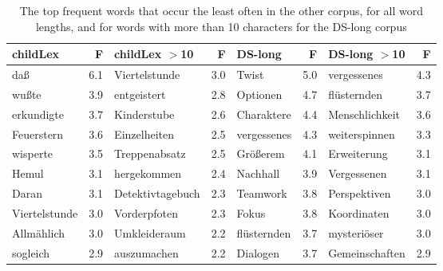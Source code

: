\documentclass[manuscript]{stjour}
\begin{document}
\begin{table}[!htbp]
\caption{The top frequent words that occur the least often in the other corpus, for all word lengths, and for words with more than 10 characters for the DS-long corpus}
\centering
\begin{tabular}{lrlrlrlr}
  \hline
childLex & F & childLex $>$10 & F & DS-long & F & DS-long $>$10 & F \\ 
  \hline
daß & 6.1 & Viertelstunde & 3.0 & Twist & 5.0 & vergessenes & 4.3 \\ 
  wußte & 3.9 & entgeistert & 2.8 & Optionen & 4.7 & flüsternden & 3.7 \\ 
  erkundigte & 3.7 & Kinderstube & 2.6 & Charaktere & 4.4 & Menschlichkeit & 3.6 \\ 
  Feuerstern & 3.6 & Einzelheiten & 2.5 & vergessenes & 4.3 & weiterspinnen & 3.3 \\ 
  wisperte & 3.5 & Treppenabsatz & 2.5 & Größerem & 4.1 & Erweiterung & 3.1 \\ 
  Hemul & 3.1 & hergekommen & 2.4 & Nachhall & 3.9 & Vergessenen & 3.1 \\ 
  Daran & 3.1 & Detektivtagebuch & 2.3 & Teamwork & 3.8 & Perspektiven & 3.0 \\ 
  Viertelstunde & 3.0 & Vorderpfoten & 2.3 & Fokus & 3.8 & Koordinaten & 3.0 \\ 
  Allmählich & 3.0 & Umkleideraum & 2.2 & flüsternden & 3.7 & mysteriöser & 3.0 \\ 
  sogleich & 2.9 & auszumachen & 2.2 & Dialogen & 3.7 & Gemeinschaften & 2.9 \\ 
   \hline
\end{tabular}
\label{words-dslo-low}
\end{table}
\end{document}
